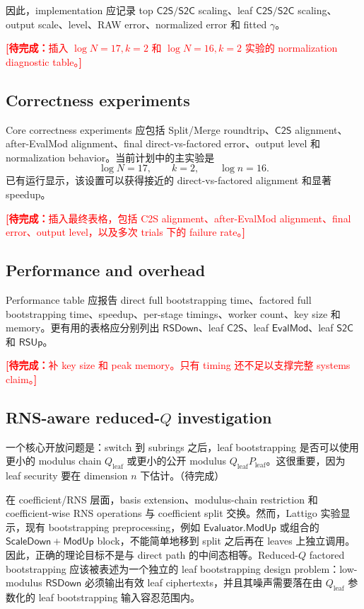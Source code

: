 \documentclass[UTF8,11pt]{article}
\newcommand{\todo}[1]{\textcolor{red}{\textbf{[待完成：}#1\textbf{]}}}
\newcommand{\RSDown}{\mathsf{RSDown}}
\newcommand{\RSUp}{\mathsf{RSUp}}
\newcommand{\CtwoS}{\mathsf{C2S}}
\newcommand{\StwoC}{\mathsf{S2C}}
\newcommand{\EvalMod}{\mathsf{EvalMod}}
\theoremstyle{definition}
\theoremstyle{plain}
\begin{document}
因此，implementation 应记录 top $\CtwoS/\StwoC$ scaling、leaf $\CtwoS/\StwoC$ scaling、output scale、level、RAW error、normalized error 和 fitted $\gamma$。

\todo{插入 $\log N=17,k=2$ 和 $\log N=16,k=2$ 实验的 normalization diagnostic table。}

\subsection{Correctness experiments}
Core correctness experiments 应包括 Split/Merge roundtrip、$\CtwoS$ alignment、after-EvalMod alignment、final direct-vs-factored error、output level 和 normalization behavior。当前计划中的主实验是
\[
\log N=17,
\qquad k=2,
\qquad \log n=16.
\]
已有运行显示，该设置可以获得接近的 direct-vs-factored alignment 和显著 speedup。

\todo{插入最终表格，包括 C2S alignment、after-EvalMod alignment、final error、output level，以及多次 trials 下的 failure rate。}

\subsection{Performance and overhead}
Performance table 应报告 direct full bootstrapping time、factored full bootstrapping time、speedup、per-stage timings、worker count、key size 和 memory。更有用的表格应分别列出 $\RSDown$、leaf $\CtwoS$、leaf $\EvalMod$、leaf $\StwoC$ 和 $\RSUp$。

\todo{补 key size 和 peak memory。只有 timing 还不足以支撑完整 systems claim。}

\subsection{RNS-aware reduced-$Q$ investigation}
一个核心开放问题是：switch 到 subrings 之后，leaf bootstrapping 是否可以使用更小的 modulus chain $Q_{\mathrm{leaf}}$ 或更小的公开 modulus $Q_{\mathrm{leaf}}P_{\mathrm{leaf}}$。这很重要，因为 leaf security 要在 dimension $n$ 下估计。（待完成）

在 coefficient/RNS 层面，basis extension、modulus-chain restriction 和 coefficient-wise RNS operations 与 coefficient split 交换。然而，Lattigo 实验显示，现有 bootstrapping preprocessing，例如 $\mathsf{Evaluator.ModUp}$ 或组合的 $\mathsf{ScaleDown}+\mathsf{ModUp}$ block，不能简单地移到 split 之后再在 leaves 上独立调用。因此，正确的理论目标不是与 direct path 的中间态相等。Reduced-$Q$ factored bootstrapping 应该被表述为一个独立的 leaf bootstrapping design problem：low-modulus $\RSDown$ 必须输出有效 leaf ciphertexts，并且其噪声需要落在由 $Q_{\mathrm{leaf}}$ 参数化的 leaf bootstrapping 输入容忍范围内。
\end{document}
